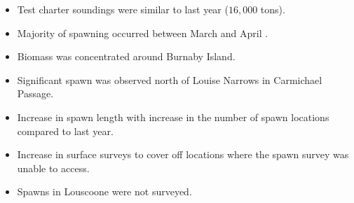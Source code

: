 \begin{itemize}
\item Test charter soundings were similar to last year ($16,000$ tons).
\item Majority of spawning occurred between March  and April .
\item Biomass was concentrated around Burnaby Island.
\item Significant spawn was observed north of Louise Narrows in Carmichael Passage.
\item Increase in spawn length with increase in the number of spawn locations compared to last year.
\item Increase in surface surveys to cover off locations where the spawn survey was unable to access.
\item Spawns in Louscoone were not surveyed.
\end{itemize}